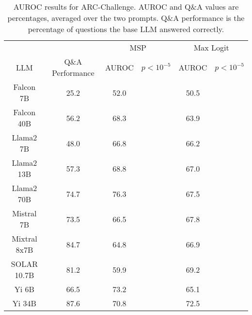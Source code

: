 \begin{table*}
\centering
\begin{tabular}{c|c|c|c|c|c}
& & \multicolumn{2}{c|}{MSP} & \multicolumn{2}{c}{Max Logit} \\ 
LLM & Q\&A Performance & AUROC & $p < 10^{-5}$ & AUROC & $p < 10^{-5}$\\ \hline
Falcon 7B & 25.2 & 52.0 &  & 50.5 & \\
Falcon 40B & 56.2 & 68.3 &  & 63.9 & \\
Llama2 7B & 48.0 & 66.8 &  & 66.2 & \\
Llama2 13B & 57.3 & 68.8 &  & 67.0 & \\
Llama2 70B & 74.7 & 76.3 &  & 67.5 & \\
Mistral 7B & 73.5 & 66.5 &  & 67.8 & \\
Mixtral 8x7B & 84.7 & 64.8 &  & 66.9 & \\
SOLAR 10.7B & 81.2 & 59.9 &  & 69.2 & \\
Yi 6B & 66.5 & 73.2 &  & 65.1 & \\
Yi 34B & 87.6 & 70.8 &  & 72.5 & \\
\hline
\end{tabular}
\caption{AUROC results for ARC-Challenge. AUROC and Q\&A values are percentages, averaged over the two prompts. Q\&A performance is the percentage of questions the base LLM answered correctly.}
\label{tab:arc_auroc}
\end{table*}
